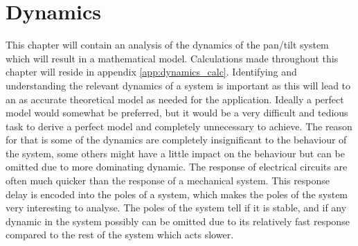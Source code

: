 \chapter{Dynamics}\label{chap:dynamics}
This chapter will contain an analysis of the dynamics of the pan/tilt system which will result in a mathematical model. Calculations made throughout this chapter will reside in appendix \ref{app:dynamics_calc}. Identifying and understanding the relevant dynamics of a system is important as this will lead to an as accurate theoretical model as needed for the application. Ideally a perfect model would somewhat be preferred, but it would be a very difficult and tedious task to derive a perfect model and completely unnecessary to achieve. The reason for that is some of the dynamics are completely insignificant to the behaviour of the system, some others might have a little impact on the behaviour but can be omitted due to more dominating dynamic. The response of electrical circuits are often much quicker than the response of a mechanical system. This response delay is encoded into the poles of a system, which makes the poles of the system very interesting to analyse. The poles of the system tell if it is stable, and if any dynamic in the system possibly can be omitted due to its relatively fast response compared to the rest of the system which acts slower.

